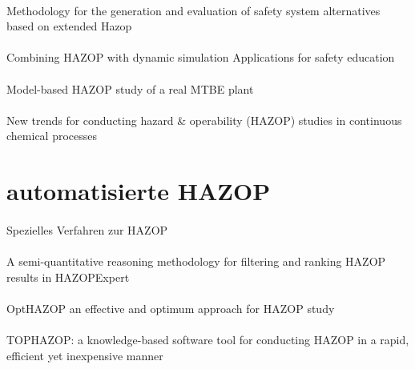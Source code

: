 \paragraph*{\cite{Ramzan_2007}} Methodology for the generation and evaluation of safety system alternatives based on extended Hazop

\paragraph*{\cite{Eizenberg_2006}} Combining {HAZOP} with dynamic simulation {\textemdash} Applications for safety education

\paragraph*{\cite{Labovsk__2007}} Model-based {HAZOP} study of a real {MTBE} plant

\paragraph*{\cite{Denti_2010}} New trends for conducting hazard \& operability (HAZOP) studies in continuous chemical processes

\section{automatisierte HAZOP}
\paragraph*{\cite{Vaidhyanathan_1995}} Spezielles Verfahren zur HAZOP

\paragraph*{\cite{Vaidhyanathan_1996}} A semi-quantitative reasoning methodology for filtering and ranking {HAZOP} results in {HAZOPExpert}

\paragraph*{\cite{Khan_1997}} {OptHAZOP }{\textemdash} an effective and optimum approach for {HAZOP} study

\paragraph*{\cite{Khan_1997a}} {TOPHAZOP}: a knowledge-based software tool for conducting {HAZOP} in a rapid, efficient yet inexpensive manner

